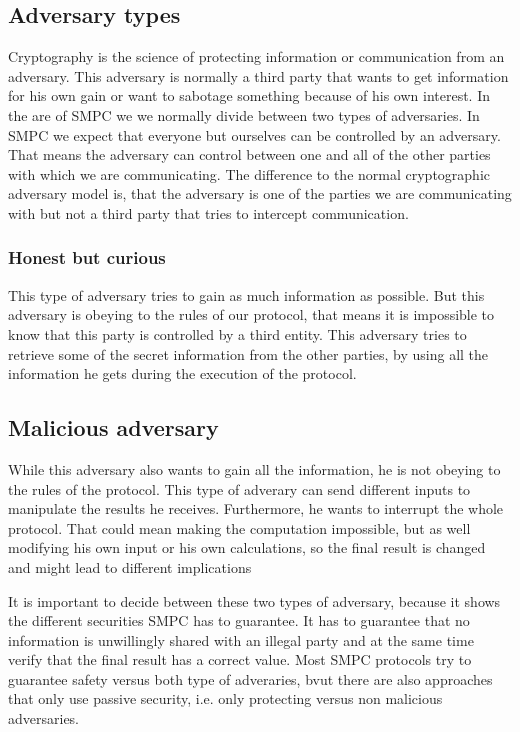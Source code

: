 \documentclass[english,runningheads,a4paper]{llncs}[2018/03/10]
\begin{document}
\subsection{Adversary types}
Cryptography is the science of protecting information or communication from an adversary. This adversary is normally a third party that wants to get information for his own gain or want to sabotage something because of his own interest. In the are of SMPC we we normally divide between two types of adversaries. In SMPC we expect that everyone but ourselves can be controlled by an adversary.  That means the adversary can control between one and all of the other parties with which we are communicating. The difference to the normal cryptographic adversary model is, that the adversary is one of the parties we are communicating with but not a third party that tries to intercept communication.
\subsubsection{Honest but curious}
This type of adversary tries to gain as much information as possible. But this adversary is obeying to the rules of our protocol, that means it is impossible to know that this party is controlled by a third entity. This adversary tries to retrieve some of the secret information from the other parties, by using all the information he gets during the execution of the protocol.

\subsection{Malicious adversary}
While this adversary also wants to gain all the information, he is not obeying to the rules of the protocol. This type of adverary can send different inputs to manipulate the results he receives. Furthermore, he wants to interrupt the whole protocol. That could mean making the computation impossible, but as well modifying his own input or his own calculations, so the final result is changed and might lead to different implications

It is important to decide between these two types of adversary, because it shows the different securities SMPC has to guarantee. It has to guarantee that no information is unwillingly shared with an illegal party and at the same time verify that the final result has a correct value. Most SMPC protocols try to guarantee safety versus both type of adveraries, bvut there are also approaches that only use passive security, i.e. only protecting versus non malicious adversaries.
\end{document}
